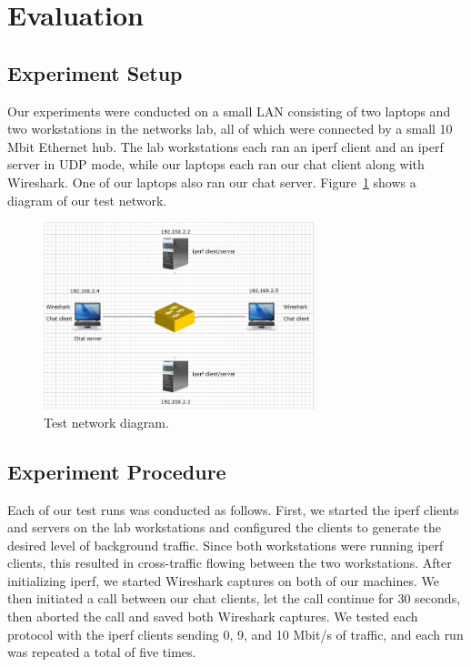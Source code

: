 
\section{Evaluation}

\subsection{Experiment Setup}

Our experiments were conducted on a small LAN consisting of two laptops and two
workstations in the networks lab, all of which were connected by a small 10 Mbit
Ethernet hub. The lab workstations each ran an iperf client and an iperf server
in UDP mode, while our laptops each ran our chat client along with Wireshark.
One of our laptops also ran our chat server. Figure~\ref{fig:test_network} shows a
diagram of our test network.

\begin{figure}[!t]
   \centering
      \includegraphics[width=0.7\textwidth]{pics/network_diagram}
   \caption{Test network diagram.}
\label{fig:test_network}
\end{figure}

\subsection{Experiment Procedure}

Each of our test runs was conducted as follows. First, we started the iperf
clients and servers on the lab workstations and configured the clients to
generate the desired level of background traffic. Since both workstations were
running iperf clients, this resulted in cross-traffic flowing between the two
workstations. After initializing iperf, we started Wireshark captures on both of
our machines. We then initiated a call between our chat clients, let the call
continue for 30 seconds, then aborted the call and saved both Wireshark captures. We
tested each protocol with the iperf clients sending 0, 9, and 10 Mbit/s of
traffic, and each run was repeated a total of five times.

